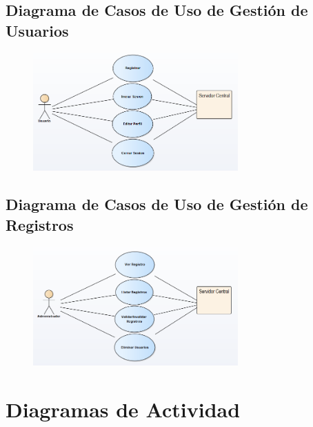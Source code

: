 \subsection{Diagrama de Casos de Uso de Gestión de Usuarios}

\begin{figure}[H]
  \centering
    \includegraphics[width=0.7\textwidth]{imagenes/analisis/casos-uso-usuario.png}
	\label{fig:casos-de-uso-usuario}
\end{figure}

\subsection{Diagrama de Casos de Uso de Gestión de Registros}

\begin{figure}[H]
  \centering
    \includegraphics[width=0.7\textwidth]{imagenes/analisis/casos-uso-registros.png}
    \label{fig:casos-de-uso-tienda}
\end{figure}


\section{Diagramas de Actividad}

